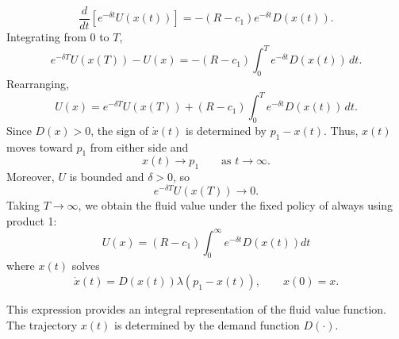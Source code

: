 \documentclass[11pt]{article}
\begin{document}
\begin{equation}
    \frac{d}{dt}
    \left[
        e^{-\delta t}U(x(t))
    \right]=-(R-c_1)e^{-\delta t}D(x(t)).
\end{equation}
Integrating from $0$ to $T$,
\begin{equation}
    e^{-\delta T}U(x(T))-U(x)=-(R-c_1)\int_0^T e^{-\delta t}D(x(t))\,dt.
\end{equation}
Rearranging,
\begin{equation}
    U(x)=e^{-\delta T}U(x(T))+(R-c_1)\int_0^T e^{-\delta t}D(x(t))\,dt.
\end{equation}
Since $D(x)>0$, the sign of $\dot{x}(t)$ is determined by $p_1-x(t)$.
Thus, $x(t)$ moves toward $p_1$ from either side and
\begin{equation}
    x(t) \rightarrow p_1
    \qquad \text{as } t\rightarrow\infty.
\end{equation}
Moreover, $U$ is bounded and $\delta>0$, so
\begin{equation}
    e^{-\delta T}U(x(T))\rightarrow 0.
\end{equation}
Taking $T\rightarrow\infty$, we obtain the fluid value under the fixed
policy of always using product 1:
\begin{equation}
    U(x) = (R-c_1) \int_0^\infty e^{-\delta t}D(x(t))dt
\end{equation}
where $x(t)$ solves
\begin{equation}
    \dot{x}(t)=D(x(t))\lambda(p_1-x(t)),\qquad x(0)=x.
\end{equation}

This expression provides an integral representation of the fluid value function. The trajectory $x(t)$ is determined by the demand function
$D(\cdot)$. 
\end{document}

